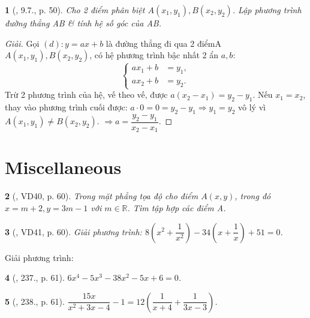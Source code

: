 \documentclass{article}
\newtheorem{baitoan}{}
\begin{document}
\begin{baitoan}[\cite{TLCT_THCS_Toan_9_dai_so}, 9.7., p. 50]
	Cho 2 điểm phân biệt $A(x_1,y_1),B(x_2,y_2)$. Lập phương trình đường thẳng AB \& tính hệ số góc của AB.
\end{baitoan}

\begin{proof}[Giải]
	Gọi $(d):y = ax + b$ là đường thẳng đi qua 2 điểmA $A(x_1,y_1),B(x_2,y_2)$, có hệ phương trình bậc nhất 2 ẩn $a,b$:
	\begin{equation*}
		\left\{\begin{split}
			ax_1 + b &= y_1,\\
			ax_2 + b &= y_2.
		\end{split}\right.
	\end{equation*}
	Trừ 2 phương trình của hệ, vế theo vế, được $a(x_2 - x_1) = y_2 - y_1$. Nếu $x_1 = x_2$, thay vào phương trình cuối được: $a\cdot 0 = 0 = y_2 - y_1\Rightarrow y_1 = y_2$ vô lý vì$A(x_1,y_1)\ne B(x_2,y_2)$. $\Rightarrow a = \dfrac{y_2 - y_1}{x_2 - x_1}$.
\end{proof}


\section{Miscellaneous}

\begin{baitoan}[\cite{Tuyen_Toan_8}, VD40, p. 60]
	Trong mặt phẳng tọa độ cho điểm $A(x,y)$, trong đó $x = m + 2,y = 3m - 1$ với $m\in\mathbb{R}$. Tìm tập hợp các điểm A.
\end{baitoan}

\begin{baitoan}[\cite{Tuyen_Toan_8}, VD41, p. 60]
	Giải phương trình: $8\left(x^2 + \dfrac{1}{x^2}\right) - 34\left(x + \dfrac{1}{x}\right) + 51 = 0$.
\end{baitoan}
Giải phương trình:

\begin{baitoan}[\cite{Tuyen_Toan_8}, 237., p. 61]
	$6x^4 - 5x^3 - 38x^2 - 5x + 6 = 0$.
\end{baitoan}

\begin{baitoan}[\cite{Tuyen_Toan_8}, 238., p. 61]
	$\dfrac{15x}{x^2 + 3x - 4} - 1 = 12\left(\dfrac{1}{x + 4} + \dfrac{1}{3x - 3}\right)$.
\end{baitoan}
\end{document}

